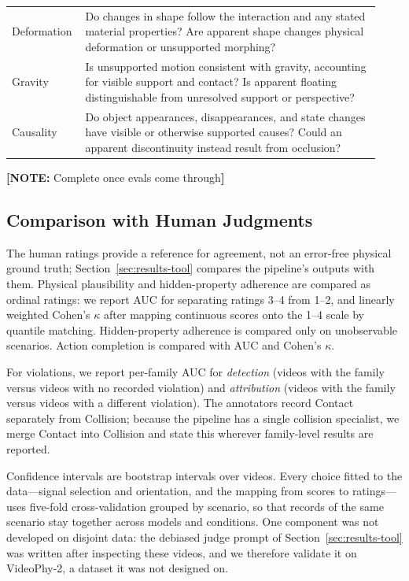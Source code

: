 \documentclass{article} %
\newcommand{\authornote}[1]{\textcolor{AuthorNote}{\textbf{[NOTE:} #1\textbf{]}}}
\begin{document}
\begin{table}[t]
\begin{tabular}{@{}p{0.16\linewidth}p{0.77\linewidth}@{}}
        Deformation &
        Do changes in shape follow the interaction and
        any stated material properties? Are apparent
        shape changes physical deformation or
        unsupported morphing? \\

        Gravity &
        Is unsupported motion consistent with gravity,
        accounting for visible support and contact?
        Is apparent floating distinguishable from
        unresolved support or perspective? \\

        Causality &
        Do object appearances, disappearances, and
        state changes have visible or otherwise
        supported causes? Could an apparent
        discontinuity instead result from occlusion? \\
        \bottomrule
    \end{tabular}
\end{table}

\authornote{Complete once evals come through}
\subsection{Comparison with Human Judgments}
\label{sec:pipeline-human-comparison}

The human ratings provide a reference for agreement, not an
error-free physical ground truth; Section~\ref{sec:results-tool}
compares the pipeline's outputs with them. Physical plausibility
and hidden-property adherence are compared as ordinal ratings: we
report AUC for separating ratings 3--4 from 1--2, and linearly
weighted Cohen's $\kappa$ after mapping continuous scores onto the
1--4 scale by quantile matching. Hidden-property adherence is
compared only on unobservable scenarios. Action completion is
compared with AUC and Cohen's $\kappa$.

For violations, we report per-family AUC for \emph{detection}
(videos with the family versus videos with no recorded violation)
and \emph{attribution} (videos with the family versus videos with
a different violation). The annotators record Contact separately
from Collision; because the pipeline has a single collision
specialist, we merge Contact into Collision and state this wherever
family-level results are reported.

Confidence intervals are bootstrap intervals over videos. Every
choice fitted to the data---signal selection and orientation, and
the mapping from scores to ratings---uses five-fold
cross-validation grouped by scenario, so that records of the same
scenario stay together across models and conditions. One component
was not developed on disjoint data: the debiased judge prompt of
Section~\ref{sec:results-tool} was written after inspecting these
videos, and we therefore validate it on VideoPhy-2, a dataset it
was not designed on.
\end{document}
